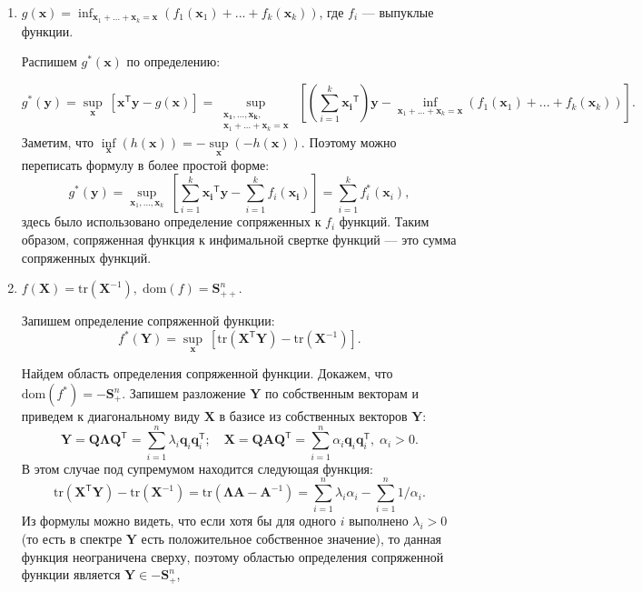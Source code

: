 \documentclass[a4paper,12pt]{article}
\begin{document}
\begin{enumerate}
		\item $g(\mathbf{x}) = \inf_{\mathbf{x}_1+...+\mathbf{x}_k = \mathbf{x}}(f_1(\mathbf{x}_1) + ... + f_k(\mathbf{x}_k))$, где $f_i$ --- выпуклые функции.
		
		Распишем $g^*(\mathbf{x})$ по определению:
		
		$$
			g^*(\mathbf{y}) =  \sup\limits_{\mathbf{x}}~\left[\mathbf{x}^\mathsf{T}\mathbf{y} - g(\mathbf{x})\right] = \sup\limits_{\substack{\mathbf{x_1},...,\mathbf{x_k},\\ \mathbf{x}_1+...+\mathbf{x}_k = \mathbf{x}}}~\left[\left(\sum\limits_{i=1}^k \mathbf{x_i}^\mathsf{T}\right)\mathbf{y} - \inf_{\mathbf{x}_1+...+\mathbf{x}_k = \mathbf{x}}(f_1(\mathbf{x}_1) + ... + f_k(\mathbf{x}_k))\right].
		$$
		Заметим, что $\inf\limits_\mathbf{x}(h(\mathbf{x})) = -\sup\limits_\mathbf{x}(-h(\mathbf{x}))$. Поэтому можно переписать формулу в более простой форме:
		$$
		g^*(\mathbf{y}) =  \sup\limits_{\mathbf{x}_1,...,\mathbf{x}_k}~\left[\sum\limits_{i=1}^k \mathbf{x_i}^\mathsf{T} \mathbf{y} - \sum\limits_{i=1}^k f_i(\mathbf{x_i})\right] = \sum\limits_{i=1}^k f_i^*(\mathbf{x}_i),
		$$
		здесь было использовано определение сопряженных к $f_i$ функций. Таким образом, сопряженная функция к инфимальной свертке функций --- это сумма сопряженных функций.
		
		\item 
		
		$f(\mathbf{X}) = \text{tr}(\mathbf{X}^{-1}),\; \text{dom}(f) = \mathbf{S}^n_{++} $.
		
		Запишем определение сопряженной функции:
		$$
		f^*(\mathbf{Y}) = \sup\limits_{\mathbf{x}}~\left[\text{tr}(\mathbf{X}^\mathsf{T}\mathbf{Y}) - \text{tr}(\mathbf{X}^{-1}) \right].
		$$
		
		Найдем область определения сопряженной функции. Докажем, что $\text{dom}(f^*) = -\mathbf{S}^n_{+}$. Запишем разложение $\mathbf{Y}$ по собственным векторам и приведем к диагональному виду $\mathbf{X}$ в базисе из собственных векторов $\mathbf{Y}$: 
		$$
		\mathbf{Y} = \mathbf{Q} \mathbf{\Lambda} \mathbf{Q}^\mathsf{T} = \sum\limits_{i=1}^n \lambda_i \mathbf{q}_i \mathbf{q}_i^\mathsf{T};\quad
		 \mathbf{X} =\mathbf{Q} \mathbf{A} \mathbf{Q}^\mathsf{T} = \sum\limits_{i=1}^n \alpha_i \mathbf{q}_i \mathbf{q}_i^\mathsf{T},\; \alpha_i > 0. 
		$$
		В этом случае под супремумом находится следующая функция:
		$$
		\text{tr}(\mathbf{X}^\mathsf{T}\mathbf{Y}) - \text{tr}(\mathbf{X}^{-1}) = \text{tr}(\mathbf{\Lambda} \mathbf{A} - \mathbf{A}^{-1}) = \sum_{i=1}^n \lambda_i \alpha_i - \sum_{i=1}^n 1/\alpha_i.
		$$
		Из формулы можно видеть, что если хотя бы для одного $i$ выполнено $\lambda_i > 0$ (то есть в спектре $\mathbf{Y}$ есть положительное собственное значение), то данная функция неограничена сверху, поэтому областью определения сопряженной функции является $\mathbf{Y} \in -\mathbf{S}^n_{+}$, 
		

\end{enumerate}
\end{document}
